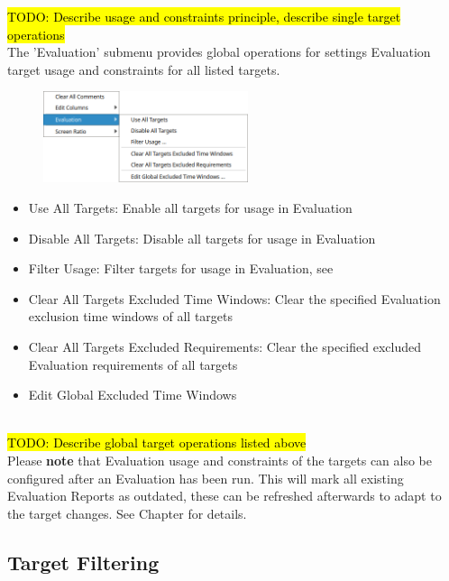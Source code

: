 \hl{TODO: Describe usage and constraints principle, describe single target operations} \\

The 'Evaluation' submenu provides global operations for settings Evaluation target usage and constraints for all listed targets.

\begin{figure}[H]
  \center
  \includegraphics[width=6cm,frame]{figures/ui_targets_config_eval.png}
\end{figure}

\begin{itemize}
  \item Use All Targets: Enable all targets for usage in Evaluation
  \item Disable All Targets: Disable all targets for usage in Evaluation
  \item Filter Usage: Filter targets for usage in Evaluation, see 
  \item Clear All Targets Excluded Time Windows: Clear the specified Evaluation exclusion time windows of all targets
  \item Clear All Targets Excluded Requirements: Clear the specified excluded Evaluation requirements of all targets
  \item Edit Global Excluded Time Windows
\end{itemize} 
\ \\

\hl{TODO: Describe global target operations listed above} \\

Please \textbf{note} that Evaluation usage and constraints of the targets can also be configured after an Evaluation has been run.
This will mark all existing Evaluation Reports as outdated, these can be refreshed afterwards to adapt to the target changes.
See Chapter  for details.

\subsection{Target Filtering}
\label{sec:ui_target_filtering}

